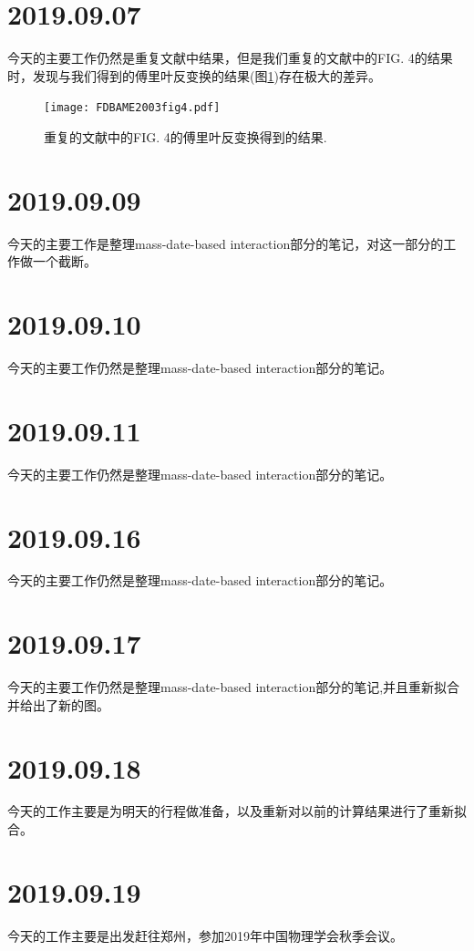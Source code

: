 \section{2019.09.07}
今天的主要工作仍然是重复文献\cite{RN569}中结果，但是我们重复的文献\cite{RN569}中的FIG. 4的结果时，发现与我们得到的傅里叶反变换的结果(图\ref{fig_FDBAME2003fig4})存在极大的差异。
\begin{figure}[H]
\centering
\texttt{[image: FDBAME2003fig4.pdf]}
\caption{重复的文献\cite{RN569}中的FIG. 4的傅里叶反变换得到的结果.\label{fig_FDBAME2003fig4}}
\end{figure}

\section{2019.09.09}
今天的主要工作是整理mass-date-based interaction部分的笔记，对这一部分的工作做一个截断。

\section{2019.09.10}
今天的主要工作仍然是整理mass-date-based interaction部分的笔记。

\section{2019.09.11}
今天的主要工作仍然是整理mass-date-based interaction部分的笔记。

\section{2019.09.16}
今天的主要工作仍然是整理mass-date-based interaction部分的笔记。

\section{2019.09.17}
今天的主要工作仍然是整理mass-date-based interaction部分的笔记,并且重新拟合并给出了新的图。

\section{2019.09.18}
今天的工作主要是为明天的行程做准备，以及重新对以前的计算结果进行了重新拟合。

\section{2019.09.19}
今天的工作主要是出发赶往郑州，参加2019年中国物理学会秋季会议。

